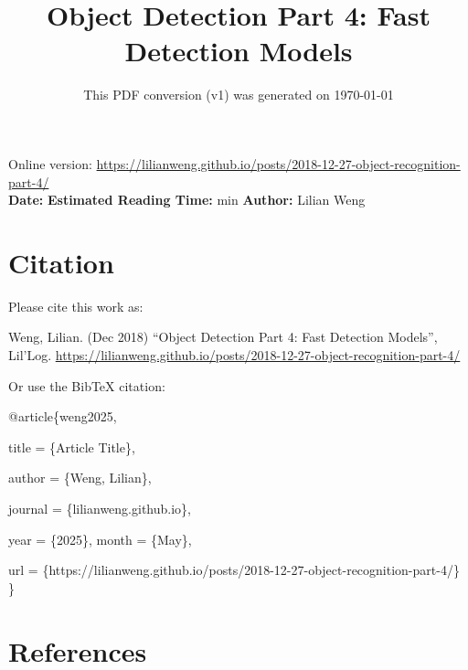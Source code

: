\documentclass[12pt]{article}
\title{Object Detection Part 4: Fast Detection Models}
\date{This PDF conversion (v1) was generated on \today\footnotemark}
\begin{document}
\maketitle
\begin{center}
    Online version: \url{https://lilianweng.github.io/posts/2018-12-27-object-recognition-part-4/} \\
    \textbf{Date:} \quad
    \textbf{Estimated Reading Time:}  min \quad
    \textbf{Author:} Lilian Weng
\end{center}




\newpage
\tableofcontents
\newpage
\vspace{1em}
\n\n\n\section{Citation}
Please cite this work as:

\begin{tcolorbox}[colback=black!5!white, colframe=black!80!white, boxrule=0.5pt, arc=2mm, left=1mm, right=1mm, top=1mm, bottom=1mm]
  Weng, Lilian. (Dec 2018) ``Object Detection Part 4: Fast Detection Models'', Lil'Log. \url{https://lilianweng.github.io/posts/2018-12-27-object-recognition-part-4/}
  \end{tcolorbox}

Or use the BibTeX citation:

\begin{tcolorbox}[
    colback=black!5!white,
    colframe=black!80!white,
    boxrule=0.5pt,
    arc=2mm,
    left=1mm,
    right=1mm,
    top=1mm,
    bottom=1mm,
    listing only,
    listing options={
      basicstyle=\ttfamily\footnotesize,
      breaklines=true,
      literate={\{}{{\char`\{}}1 {\}}{{\char`\}}}1
    }
  ]
  @article\{weng2025,

    title   = \{Article Title\},

    author  = \{Weng, Lilian\},

    journal = \{lilianweng.github.io\},

    year    = \{2025\},
    month   = \{May\},

    url     = \{https://lilianweng.github.io/posts/2018-12-27-object-recognition-part-4/\}\n
  \}
  \end{tcolorbox}

\newpage
\section{References}

\n
\end{document}
